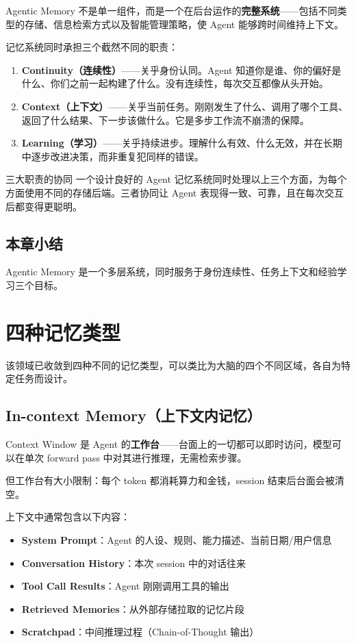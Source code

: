 \documentclass[a4paper]{article}
\begin{document}
Agentic Memory 不是单一组件，而是一个在后台运作的\textbf{完整系统}——包括不同类型的存储、信息检索方式以及智能管理策略，使 Agent 能够跨时间维持上下文。

记忆系统同时承担三个截然不同的职责：

\begin{enumerate}[leftmargin=2em]
    \item \textbf{Continuity（连续性）}——关乎身份认同。Agent 知道你是谁、你的偏好是什么、你们之前一起构建了什么。没有连续性，每次交互都像从头开始。
    \item \textbf{Context（上下文）}——关乎当前任务。刚刚发生了什么、调用了哪个工具、返回了什么结果、下一步该做什么。它是多步工作流不崩溃的保障。
    \item \textbf{Learning（学习）}——关乎持续进步。理解什么有效、什么无效，并在长期中逐步改进决策，而非重复犯同样的错误。
\end{enumerate}

\begin{knowledgebox}{三大职责的协同}
一个设计良好的 Agent 记忆系统同时处理以上三个方面，为每个方面使用不同的存储后端。三者协同让 Agent 表现得一致、可靠，且在每次交互后都变得更聪明。
\end{knowledgebox}

\subsection{本章小结}

Agentic Memory 是一个多层系统，同时服务于身份连续性、任务上下文和经验学习三个目标。

\section{四种记忆类型}

该领域已收敛到四种不同的记忆类型，可以类比为大脑的四个不同区域，各自为特定任务而设计。

\subsection{In-context Memory（上下文内记忆）}

Context Window 是 Agent 的\textbf{工作台}——台面上的一切都可以即时访问，模型可以在单次 forward pass 中对其进行推理，无需检索步骤。

但工作台有大小限制：每个 token 都消耗算力和金钱，session 结束后台面会被清空。

上下文中通常包含以下内容：
\begin{itemize}[leftmargin=2em]
    \item \textbf{System Prompt}：Agent 的人设、规则、能力描述、当前日期/用户信息
    \item \textbf{Conversation History}：本次 session 中的对话往来
    \item \textbf{Tool Call Results}：Agent 刚刚调用工具的输出
    \item \textbf{Retrieved Memories}：从外部存储拉取的记忆片段
    \item \textbf{Scratchpad}：中间推理过程（Chain-of-Thought 输出）
\end{itemize}
\end{document}
